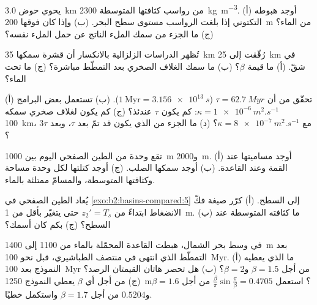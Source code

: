 \begin{exercise}[$\star$]\label{exo:b2:basins-compared:2}
يحوي حوض \qty{3.0}{km} من رواسب كثافتها المتوسطة \qty{2300}{kg.m^{-3}}. (أ) أوجد
هبوطه التكتوني إذا بلغت الرواسب مستوى سطح البحر. (ب) وإذا كان فوقها \qty{200}{m} من
الماء؟ (ج) ما الجزء من سمك الملء الناتج عن حمل الملء نفسه؟
\end{exercise}

\begin{exercise}[$\star$]\label{exo:b2:basins-compared:3}
تُظهر الدراسات الزلزالية بالانكسار أن قشرة سمكها \qty{35}{km} رُقّقت إلى \qty{25}{km} في شقّ.
(أ) ما قيمة $\beta$؟ (ب) ما سمك الغلاف الصخري بعد التمطّط مباشرة؟ (ج) ما
 تحت الماء؟
\end{exercise}

\begin{exercise}[$\star$]\label{exo:b2:basins-compared:4}
(أ) تحقّق من أن $\tau = \qty{62.7}{Myr}$ ($1~\text{Myr} = \qty{3.156e13}{s}$). (ب) تستعمل بعض البرامج
$\kappa = \qty{1e-6}{m^2.s^{-1}}$: كم يكون $\tau$ عندئذ؟ (ج) كم يكون لغلاف
صخري سمكه \qty{100}{km}، مع $\kappa = \qty{8e-7}{m^2.s^{-1}}$؟ (د) ما الجزء من
 الذي يكون قد تمّ بعد $\tau$، وبعد $3\tau$؟
\end{exercise}

\begin{exercise}[$\star\star$]\label{exo:b2:basins-compared:5}
تقع وحدة من الطين الصفحي اليوم بين \qty{1000}{m} و\qty{2000}{m}. (أ) أوجد مساميتها عند
القمة وعند القاعدة. (ب) أوجد سمكها الصلب. (ج) أوجد كتلتها لكل وحدة مساحة وكثافتها
المتوسطة، والمسامّ ممتلئة بالماء.
\end{exercise}

\begin{exercise}[$\star\star$]\label{exo:b2:basins-compared:6}
يُعاد الطين الصفحي في \cref{exo:b2:basins-compared:5} إلى السطح. (أ) كرّر
صيغة فكّ الانضغاط ابتداءً من $z_2' = T_s$ حتى يتغيّر بأقل من \qty{1}{m}. (ب) ما
كثافته المتوسطة عند السطح؟ (ج) بكم كان أسمك؟
\end{exercise}

\begin{exercise}[$\star\star$]\label{exo:b2:basins-compared:7}
في وسط بحر الشمال، هبطت القاعدة المحمّلة بالماء من 1100 إلى \qty{1400}{m} بعد
التمطّط الذي انتهى في منتصف الطباشيري، قبل نحو \qty{100}{Myr}. (أ) ما  الذي يعطيه النموذج بعد \qty{100}{Myr} من أجل $\beta = 1.5$ و$\beta = 2$؟ (ب) هل
تحصر هاتان القيمتان الرصد؟ (ج) من أجل أي $\beta$ يعطي النموذج \qty{1250}{m}؟
استعمل $\frac{\beta}{\pi}\sin\frac{\pi}{\beta} = 0.4705$ من أجل $\beta = 1.6$ و$0.5204$ من أجل $\beta
= 1.7$ واستكمل خطيًا.
\end{exercise}

